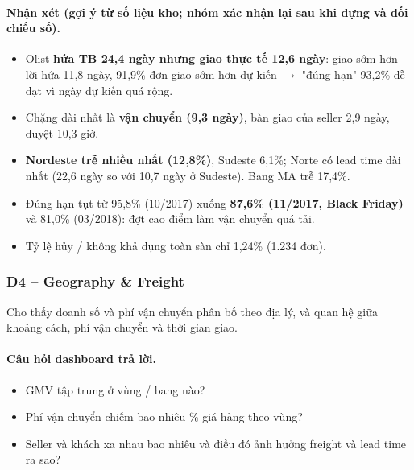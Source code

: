 \paragraph{Nhận xét (gợi ý từ số liệu kho; \textbf{nhóm xác nhận lại sau khi dựng và đối chiếu số}).}

\begin{itemize}
  \item Olist \textbf{hứa TB 24,4 ngày nhưng giao thực tế 12,6 ngày}: giao sớm hơn lời hứa 11,8 ngày, 91,9\% đơn giao sớm hơn dự kiến $\rightarrow$ "đúng hạn" 93,2\% dễ đạt vì ngày dự kiến quá rộng.
  \item Chặng dài nhất là \textbf{vận chuyển (9,3 ngày)}, bàn giao của seller 2,9 ngày, duyệt 10,3 giờ.
  \item \textbf{Nordeste trễ nhiều nhất (12,8\%)}, Sudeste 6,1\%; Norte có lead time dài nhất (22,6 ngày so với 10,7 ngày ở Sudeste). Bang MA trễ 17,4\%.
  \item Đúng hạn tụt từ 95,8\% (10/2017) xuống \textbf{87,6\% (11/2017, Black Friday)} và 81,0\% (03/2018): đợt cao điểm làm vận chuyển quá tải.
  \item Tỷ lệ hủy / không khả dụng toàn sàn chỉ 1,24\% (1.234 đơn).
\end{itemize}

\subsubsection*{D4 – Geography \& Freight}

Cho thấy doanh số và phí vận chuyển phân bố theo địa lý, và quan hệ giữa khoảng cách, phí vận chuyển và thời gian giao.

\paragraph{Câu hỏi dashboard trả lời.}

\begin{itemize}
  \item GMV tập trung ở vùng / bang nào?
  \item Phí vận chuyển chiếm bao nhiêu \% giá hàng theo vùng?
  \item Seller và khách xa nhau bao nhiêu và điều đó ảnh hưởng freight và lead time ra sao?
\end{itemize}


